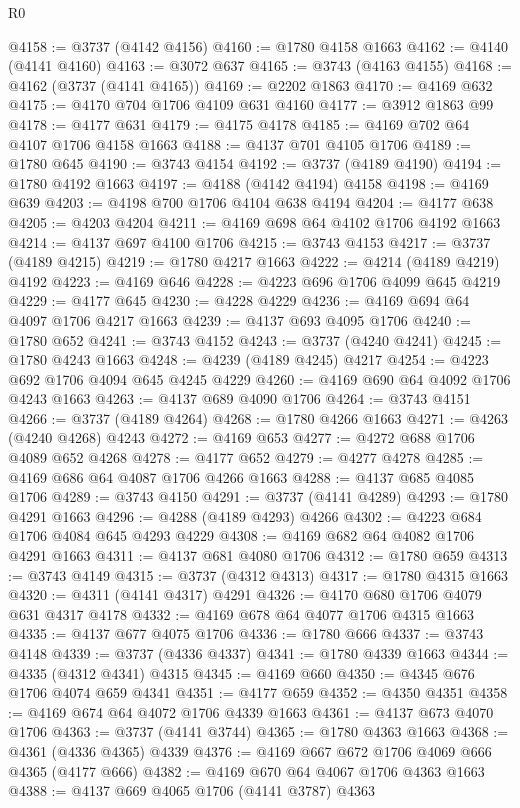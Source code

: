 \begin{lexlean}{R0}
\begin{coremodule}
@4158 := @3737 (@4142 @4156)
@4160 := @1780 @4158 @1663
@4162 := @4140 (@4141 @4160)
@4163 := @3072 @637
@4165 := @3743 (@4163 @4155)
@4168 := @4162 (@3737 (@4141 @4165))
@4169 := @2202 @1863
@4170 := @4169 @632
@4175 := @4170 @704 @1706 @4109 @631 @4160
@4177 := @3912 @1863 @99
@4178 := @4177 @631
@4179 := @4175 @4178
@4185 := @4169 @702 @64 @4107 @1706 @4158 @1663
@4188 := @4137 @701 @4105 @1706
@4189 := @1780 @645
@4190 := @3743 @4154
@4192 := @3737 (@4189 @4190)
@4194 := @1780 @4192 @1663
@4197 := @4188 (@4142 @4194) @4158
@4198 := @4169 @639
@4203 := @4198 @700 @1706 @4104 @638 @4194
@4204 := @4177 @638
@4205 := @4203 @4204
@4211 := @4169 @698 @64 @4102 @1706 @4192 @1663
@4214 := @4137 @697 @4100 @1706
@4215 := @3743 @4153
@4217 := @3737 (@4189 @4215)
@4219 := @1780 @4217 @1663
@4222 := @4214 (@4189 @4219) @4192
@4223 := @4169 @646
@4228 := @4223 @696 @1706 @4099 @645 @4219
@4229 := @4177 @645
@4230 := @4228 @4229
@4236 := @4169 @694 @64 @4097 @1706 @4217 @1663
@4239 := @4137 @693 @4095 @1706
@4240 := @1780 @652
@4241 := @3743 @4152
@4243 := @3737 (@4240 @4241)
@4245 := @1780 @4243 @1663
@4248 := @4239 (@4189 @4245) @4217
@4254 := @4223 @692 @1706 @4094 @645 @4245 @4229
@4260 := @4169 @690 @64 @4092 @1706 @4243 @1663
@4263 := @4137 @689 @4090 @1706
@4264 := @3743 @4151
@4266 := @3737 (@4189 @4264)
@4268 := @1780 @4266 @1663
@4271 := @4263 (@4240 @4268) @4243
@4272 := @4169 @653
@4277 := @4272 @688 @1706 @4089 @652 @4268
@4278 := @4177 @652
@4279 := @4277 @4278
@4285 := @4169 @686 @64 @4087 @1706 @4266 @1663
@4288 := @4137 @685 @4085 @1706
@4289 := @3743 @4150
@4291 := @3737 (@4141 @4289)
@4293 := @1780 @4291 @1663
@4296 := @4288 (@4189 @4293) @4266
@4302 := @4223 @684 @1706 @4084 @645 @4293 @4229
@4308 := @4169 @682 @64 @4082 @1706 @4291 @1663
@4311 := @4137 @681 @4080 @1706
@4312 := @1780 @659
@4313 := @3743 @4149
@4315 := @3737 (@4312 @4313)
@4317 := @1780 @4315 @1663
@4320 := @4311 (@4141 @4317) @4291
@4326 := @4170 @680 @1706 @4079 @631 @4317 @4178
@4332 := @4169 @678 @64 @4077 @1706 @4315 @1663
@4335 := @4137 @677 @4075 @1706
@4336 := @1780 @666
@4337 := @3743 @4148
@4339 := @3737 (@4336 @4337)
@4341 := @1780 @4339 @1663
@4344 := @4335 (@4312 @4341) @4315
@4345 := @4169 @660
@4350 := @4345 @676 @1706 @4074 @659 @4341
@4351 := @4177 @659
@4352 := @4350 @4351
@4358 := @4169 @674 @64 @4072 @1706 @4339 @1663
@4361 := @4137 @673 @4070 @1706
@4363 := @3737 (@4141 @3744)
@4365 := @1780 @4363 @1663
@4368 := @4361 (@4336 @4365) @4339
@4376 := @4169 @667 @672 @1706 @4069 @666 @4365 (@4177 @666)
@4382 := @4169 @670 @64 @4067 @1706 @4363 @1663
@4388 := @4137 @669 @4065 @1706 (@4141 @3787) @4363

\end{coremodule}
\end{lexlean}
